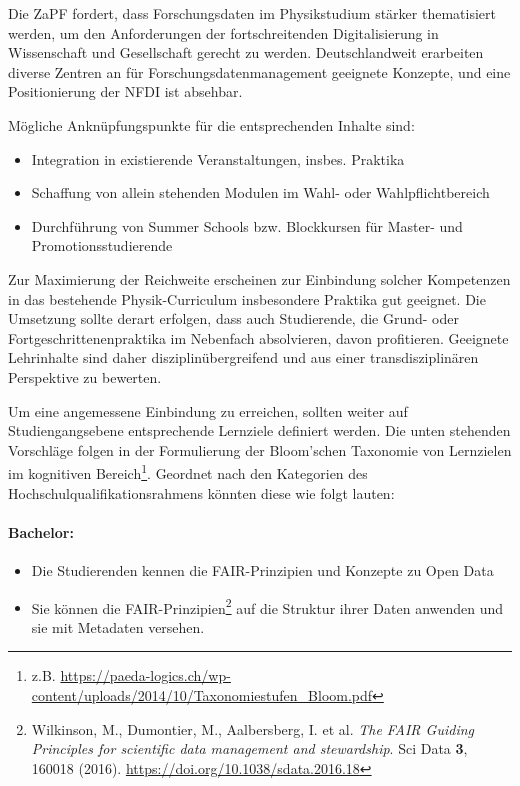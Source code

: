 \documentclass[DIV=calc]{scrartcl}
\begin{document}
Die ZaPF fordert, dass Forschungsdaten im Physikstudium stärker thematisiert werden, um den Anforderungen der fortschreitenden Digitalisierung in Wissenschaft und Gesellschaft gerecht zu werden. Deutschlandweit erarbeiten diverse Zentren an für Forschungsdatenmanagement geeignete Konzepte, und eine Positionierung der NFDI ist absehbar.

Mögliche Anknüpfungspunkte für die entsprechenden Inhalte sind:
\begin{itemize}
	\item Integration in existierende Veranstaltungen, insbes. Praktika
	\item Schaffung von allein stehenden Modulen im Wahl- oder Wahlpflichtbereich
	\item Durchführung von Summer Schools bzw. Blockkursen für Master- und Promotionsstudierende
\end{itemize}

Zur Maximierung der Reichweite erscheinen zur Einbindung solcher Kompetenzen in das bestehende Physik-Curriculum insbesondere Praktika gut geeignet. Die Umsetzung sollte derart erfolgen, dass auch Studierende, die Grund- oder Fortgeschrittenenpraktika im Nebenfach absolvieren, davon profitieren. Geeignete Lehrinhalte sind daher disziplinübergreifend und aus einer transdisziplinären Perspektive zu bewerten.

Um eine angemessene Einbindung zu erreichen, sollten weiter auf Studiengangsebene entsprechende Lernziele definiert werden. Die unten stehenden Vorschläge folgen in der Formulierung der Bloom'schen Taxonomie von Lernzielen im kognitiven Bereich\footnote{z.B. \url{https://paeda-logics.ch/wp-content/uploads/2014/10/Taxonomiestufen_Bloom.pdf}}. Geordnet nach den Kategorien des Hochschulqualifikationsrahmens könnten diese wie folgt lauten:

\paragraph{Bachelor:}
\begin{itemize}
	\item Die Studierenden kennen die FAIR-Prinzipien und Konzepte zu Open Data
	\item Sie können die FAIR-Prinzipien\footnote{Wilkinson, M., Dumontier, M., Aalbersberg, I. et al. \textit{The FAIR Guiding Principles for scientific data management and stewardship}. Sci Data \textbf{3}, 160018 (2016). \url{https://doi.org/10.1038/sdata.2016.18}}\xspace auf die Struktur ihrer Daten anwenden und sie mit Metadaten versehen.
\end{itemize}
\clearpage
\end{document}
